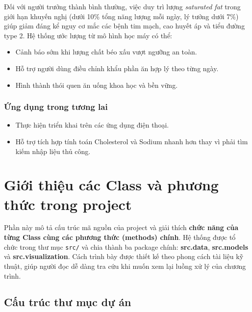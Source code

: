 \documentclass[12pt,a4paper]{article}
\begin{document}
Đối với người trưởng thành bình thường, việc duy trì lượng \textit{saturated fat} trong giới hạn khuyến nghị (dưới 10\% tổng năng lượng mỗi ngày, lý tưởng dưới 7\%) giúp giảm đáng kể nguy cơ mắc các bệnh tim mạch, cao huyết áp và tiểu đường type 2. Hệ thống ước lượng từ mô hình học máy có thể:
\begin{itemize}
    \item Cảnh báo sớm khi lượng chất béo xấu vượt ngưỡng an toàn.
    \item Hỗ trợ người dùng điều chỉnh khẩu phần ăn hợp lý theo từng ngày.
    \item Hình thành thói quen ăn uống khoa học và bền vững.
\end{itemize}

\subsubsection{Ứng dụng trong tương lai}

\begin{itemize}
    \item Thực hiện triển khai trên các ứng dụng điện thoại.
    \item Hỗ trợ tích hợp tính toán Cholesterol và Sodium nhanh hơn thay vì phải tìm kiếm nhập liệu thủ công.
\end{itemize}


\section{Giới thiệu các Class và phương thức trong project}
\label{sec:class_methods}

Phần này mô tả cấu trúc mã nguồn của project và giải thích \textbf{chức năng của từng Class cùng các phương thức (methods) chính}. 
Hệ thống được tổ chức trong thư mục \texttt{src/} và chia thành ba package chính:
\textbf{src.data}, \textbf{src.models} và \textbf{src.visualization}. 
Cách trình bày được thiết kế theo phong cách tài liệu kỹ thuật, giúp người đọc dễ dàng tra cứu khi muốn xem lại luồng xử lý của chương trình.

\subsection{Cấu trúc thư mục dự án}
\end{document}

